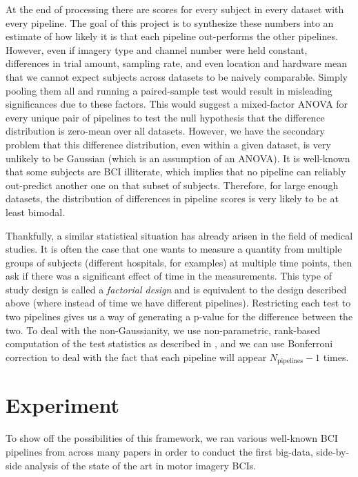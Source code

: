 At the end of processing there are scores for every subject in every
dataset with every pipeline. The goal of this project is to synthesize
these numbers into an estimate of how likely it is that each pipeline
out-performs the other pipelines. However, even if imagery type and
channel number were held constant, differences in trial amount,
sampling rate, and even location and hardware mean that we cannot
expect subjects across datasets to be naively comparable. Simply
pooling them all and running a paired-sample test would result in
misleading significances due to these factors. This would
suggest a mixed-factor ANOVA for every unique pair of pipelines to
test the null hypothesis that the difference distribution is zero-mean
over all datasets. However, we have the secondary problem that this
difference distribution, even within a given dataset, is very unlikely
to be Gaussian (which is an assumption of an ANOVA). It is well-known
that some subjects are BCI illiterate, which implies that no pipeline
can reliably out-predict another one on that subset of
subjects. Therefore, for large enough datasets, the distribution of
differences in pipeline scores is very likely to be at least bimodal.

Thankfully, a similar statistical situation has already arisen in the
field of medical studies. It is often the case that one wants to
measure a quantity from multiple groups of subjects (different
hospitals, for examples) at multiple time points, then ask if there
was a significant effect of time in the measurements. This type of
study design is called a \emph{factorial design} and is equivalent to
the design described above (where instead of time we have different
pipelines). Restricting each test to two pipelines gives us a way of
generating a p-value for the difference between the two. To deal with
the non-Gaussianity, we use non-parametric, rank-based computation of
the test statistics as described in \cite{Noguchi2012}, and we can use
Bonferroni correction to deal with the fact that each pipeline will
appear $N_{\text{pipelines}} - 1$ times.

\section{Experiment}

To show off the possibilities of this framework, we ran various well-known BCI
pipelines from across many papers in order to conduct the first big-data,
side-by-side analysis of the state of the art in motor imagery BCIs.

